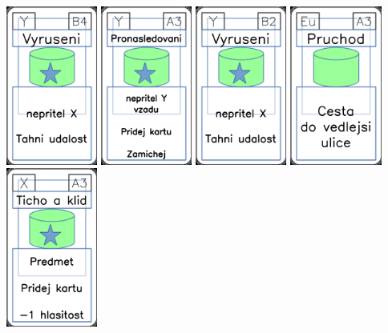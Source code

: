\documentclass[a4paper]{article}
\begin{document}
	\includegraphics[width=3.0cm]{img-5_38}
	\includegraphics[width=3.0cm]{img-5_32}
	\includegraphics[width=3.0cm]{img-5_36}
	\includegraphics[width=3.0cm]{img-4_32}
	\includegraphics[width=3.0cm]{img-5_2}
\end{document}
